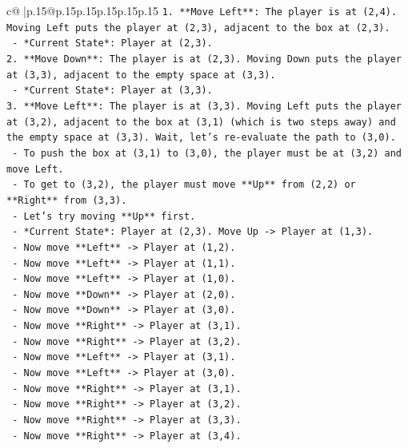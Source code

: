 \documentclass{article}
\begin{document}
{\begin{supertabular}{c@{$\;$}|p{.15\linewidth}@{}p{.15\linewidth}p{.15\linewidth}p{.15\linewidth}p{.15\linewidth}p{.15\linewidth}}
{{{\texttt{1.  **Move Left**: The player is at (2,4). Moving Left puts the player at (2,3), adjacent to the box at (2,3).} \\
\texttt{    {-}   *Current State*: Player at (2,3).} \\
\texttt{2.  **Move Down**: The player is at (2,3). Moving Down puts the player at (3,3), adjacent to the empty space at (3,3).} \\
\texttt{    {-}   *Current State*: Player at (3,3).} \\
\texttt{3.  **Move Left**: The player is at (3,3). Moving Left puts the player at (3,2), adjacent to the box at (3,1) (which is two steps away) and the empty space at (3,3). Wait, let's re{-}evaluate the path to (3,0).} \\
\texttt{    {-}   To push the box at (3,1) to (3,0), the player must be at (3,2) and move Left.} \\
\texttt{    {-}   To get to (3,2), the player must move **Up** from (2,2) or **Right** from (3,3).} \\
\texttt{    {-}   Let's try moving **Up** first.} \\
\texttt{    {-}   *Current State*: Player at (2,3). Move Up {-}> Player at (1,3).} \\
\texttt{    {-}   Now move **Left** {-}> Player at (1,2).} \\
\texttt{    {-}   Now move **Left** {-}> Player at (1,1).} \\
\texttt{    {-}   Now move **Left** {-}> Player at (1,0).} \\
\texttt{    {-}   Now move **Down** {-}> Player at (2,0).} \\
\texttt{    {-}   Now move **Down** {-}> Player at (3,0).} \\
\texttt{    {-}   Now move **Right** {-}> Player at (3,1).} \\
\texttt{    {-}   Now move **Right** {-}> Player at (3,2).} \\
\texttt{    {-}   Now move **Left** {-}> Player at (3,1).} \\
\texttt{    {-}   Now move **Left** {-}> Player at (3,0).} \\
\texttt{    {-}   Now move **Right** {-}> Player at (3,1).} \\
\texttt{    {-}   Now move **Right** {-}> Player at (3,2).} \\
\texttt{    {-}   Now move **Right** {-}> Player at (3,3).} \\
\texttt{    {-}   Now move **Right** {-}> Player at (3,4).} \\
}}}
\end{supertabular}}
\end{document}
